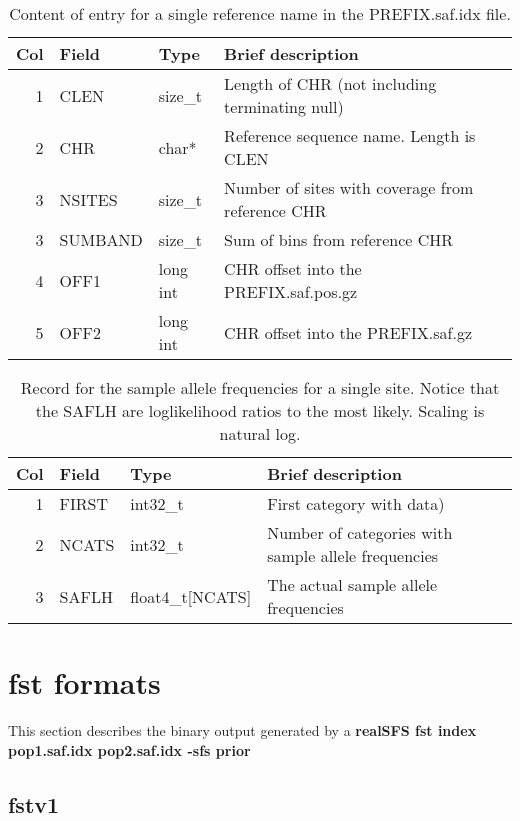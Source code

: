 \documentclass[10pt]{article}
\begin{document}
\begin{table}[h]
\begin{tabular}{rllll}
  \hline
  {\bf Col} & {\bf Field} & {\bf Type} & {\bf Brief description} \\
  \hline
  1 & {\sf CLEN} & size\_t &  Length of CHR (not including terminating null)\\
  2 & {\sf CHR} & char* & Reference sequence name. Length is CLEN\\
  3 & {\sf NSITES} & size\_t & Number of sites with coverage from reference CHR\\
  3 & {\sf SUMBAND} & size\_t & Sum of bins from reference CHR\\
  4 & {\sf OFF1} & long int & CHR offset into the PREFIX.saf.pos.gz \\
  5 & {\sf OFF2} & long int & CHR offset into the PREFIX.saf.gz \\
  \hline
\end{tabular}\label{tab4}
\caption{Content of entry for a single reference name in the PREFIX.saf.idx file.}
\end{table}

\begin{table}[h]
\begin{tabular}{rllll}
  \hline
  {\bf Col} & {\bf Field} & {\bf Type} & {\bf Brief description} \\
  \hline
  1 & {\sf FIRST} & int32\_t  &  First category with data)\\
  2 & {\sf NCATS} & int32\_t & Number of categories with sample allele frequencies\\
  3 & {\sf SAFLH} & float4\_t[NCATS] & The actual sample allele frequencies\\
  \hline
\end{tabular}
\caption{Record for the sample allele frequencies for a single site. Notice that the SAFLH are loglikelihood ratios to the most likely. Scaling is natural log.}
\label{tab3}
\end{table}

\clearpage
\section{fst formats}
This section describes the binary output generated by a \textbf{realSFS fst index pop1.saf.idx pop2.saf.idx -sfs prior}
\subsection{fstv1}
\end{document}
